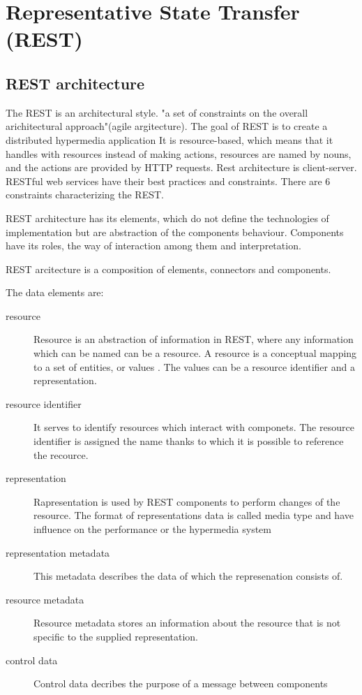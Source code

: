 \chapter{Representative State Transfer (REST)}
\label{chap:rest}


\section{REST architecture}
\label{sec:rest-architecture}

The REST is an architectural style. "a set of constraints on the overall arichitectural approach"(agile argitecture). The goal of REST is to create a distributed hypermedia application It is resource-based, which means that it handles with resources instead of making actions, resources are named by nouns, and the actions are provided by HTTP requests. Rest architecture is client-server.
RESTful web services have their best practices and constraints. There are 6 constraints characterizing the REST. 

REST architecture has its elements, which do not define the technologies of implementation but are abstraction of the components behaviour. Components have its roles, the way of interaction among them and interpretation.

REST arcitecture is a composition of elements, connectors and components.

The data elements are:

\begin{description}
  \item [resource] 
  Resource is an abstraction of information in REST, where any information which can be named can be a resource. A resource is a conceptual mapping to a set of entities, or values \cite{fielding}. The values can be a resource identifier and a representation.
  \item [resource identifier] 
  It serves to identify resources which interact with componets. The resource identifier is assigned the name thanks to which it is possible to reference the recource.
  \item [representation] 
  Rapresentation is used by REST components to perform changes of the resource. The format of representations data is called media type and have influence on the performance or the hypermedia system  
  \item [representation metadata] 
  This metadata describes the data of which the represenation consists of.
   \item [resource metadata] 
  Resource metadata stores an information about the resource that is not specific to the supplied representation.
  \item [control data]
  Control data decribes the purpose of a message between components
\end{description}

